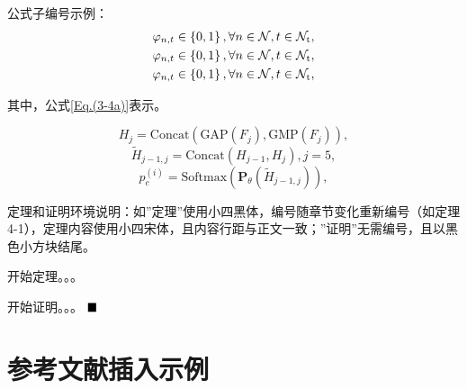 公式子编号示例：
\begin{subequations}\label{Eq.(3-4)}
	\renewcommand{\theequation}{\theparentequation-\alph{equation}} %
	\begin{align}
		&\varphi_{n,t}\in\left\{0,1\right\}, \forall n\in\mathcal{N}, t\in\mathcal{N}_{\mathrm{t}}, \label{Eq.(3-4a)} \\
		&\varphi_{n,t}\in\left\{0,1\right\}, \forall n\in\mathcal{N}, t\in\mathcal{N}_{\mathrm{t}}, \label{Eq.(3-4b)} \\
		&\varphi_{n,t}\in\left\{0,1\right\}, \forall n\in\mathcal{N}, t\in\mathcal{N}_{\mathrm{t}}, \label{Eq.(3-4c)}
	\end{align}
\end{subequations}

其中，公式\ref{Eq.(3-4a)}表示。

\begin{equation}    
	H_{j}= \mathrm{Concat}(\mathrm{GAP}({F}_{j}),\mathrm{GMP}({F}_{j})),
\end{equation}
\begin{equation}    
	\tilde{H}_{j-1,j}= \mathrm{Concat}(H_{j-1},H_{j}),j=5,
\end{equation}
\begin{equation}    
	p_c^{(i)}=\mathrm{Softmax}(\boldsymbol{P}_\theta(\tilde{H}_{j-1,j})),
\end{equation}

定理和证明环境说明：如”定理”使用小四黑体，编号随章节变化重新编号（如定理4-1），定理内容使用小四宋体，且内容行距与正文一致；”证明”无需编号，且以黑色小方块结尾。

\begin{theorem}\label{theorem1}
	\setlength{\baselineskip}{20pt}         %
	\renewcommand{\baselinestretch}{1.0}   %
	开始定理。。。
\end{theorem}

\begin{proof*} %
	\setlength{\baselineskip}{20pt}         %
	\renewcommand{\baselinestretch}{1.0}   %
	开始证明。。。
	$\hfill\blacksquare$ %
\end{proof*}

\clearpage

\section{参考文献插入示例}

